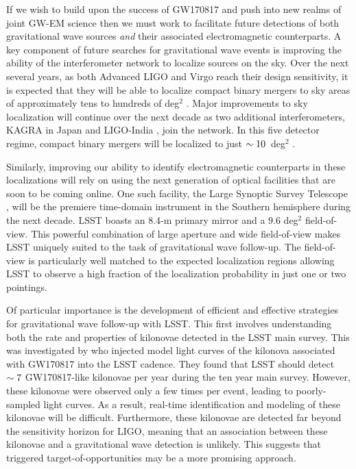 If we wish to build upon the success of GW170817 and push into new realms of joint GW-EM science then we must work to facilitate future detections of both gravitational wave sources {\em and} their associated electromagnetic counterparts. A key component of future searches for gravitational wave events is improving the ability of the interferometer network to localize sources on the sky. Over the next several years, as both Advanced LIGO and Virgo reach their design sensitivity, it is expected that they will be able to localize compact binary mergers to sky areas of approximately tens to hundreds of deg$^2$ \citep{LIGOLocalization,ChenHolz16}. Major improvements to sky localization will continue over the next decade as two additional interferometers, KAGRA in Japan \citep{KAGRA} and LIGO-India \citep{LIGOIndia}, join the network. In this five detector regime, compact binary mergers will be localized to just $\sim10$~deg$^2$ \citep{Fairhurst2014,ChenHolz16}.

Similarly, improving our ability to identify electromagnetic counterparts in these localizations will rely on using the next generation of optical facilities that are soon to be coming online. One such facility, the Large Synoptic Survey Telescope \citep[LSST,][]{Ivezic+09}, will be the premiere time-domain instrument in the Southern hemisphere during the next decade. LSST boasts an 8.4-m primary mirror and a 9.6 deg$^2$ field-of-view. This powerful combination of large aperture and wide field-of-view makes LSST uniquely suited to the task of gravitational wave follow-up. The field-of-view is particularly well matched to the expected localization regions allowing LSST to observe a high fraction of the localization probability in just one or two pointings.

Of particular importance is the development of efficient and effective strategies for gravitational wave follow-up with LSST. This first involves understanding both the rate and properties of kilonovae detected in the LSST main survey. This was investigated by \citet{Scolnic+18} who injected model light curves of the kilonova associated with GW170817 \citep[hereafer just ``GW170817" for simplicity][]{Cowp+17} into the LSST cadence. They found that LSST should detect $\sim7$ GW170817-like kilonovae per year during the ten year main survey. However, these kilonovae were observed only a few times per event, leading to poorly-sampled light curves. As a result, real-time identification and modeling of these kilonovae will be difficult. Furthermore, these kilonovae are detected far beyond the sensitivity horizon for LIGO, meaning that an association between these kilonovae and a gravitational wave detection is unlikely. This suggests that triggered target-of-opportunities may be a more promising approach.

